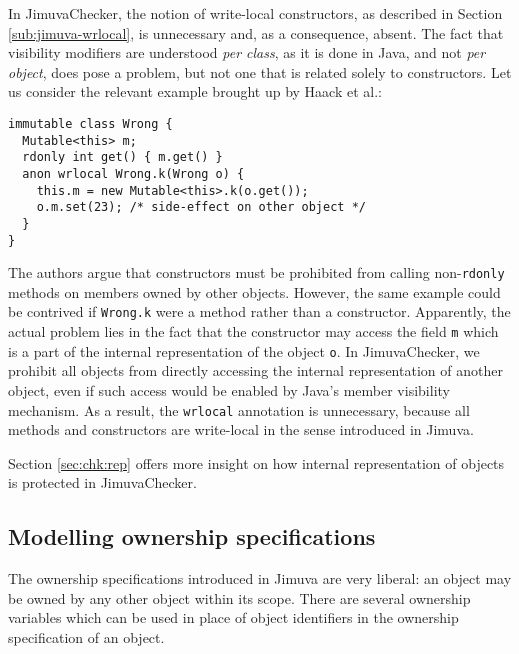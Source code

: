 \documentclass{pracamgr}
\theoremstyle{break}
\theoremstyle{break}
\theoremstyle{break}
\begin{document}
In JimuvaChecker, the notion of write-local constructors, as described
in Section \ref{sub:jimuva-wrlocal}, is unnecessary and, as a
consequence, absent. The fact that visibility modifiers are understood
\emph{per class}, as it is done in Java, and not \emph{per object},
does pose a problem, but not one that is related solely to
constructors. Let us consider the relevant example brought up by Haack
et al.:
\begin{lstlisting}[morekeywords={immutable, anon, wrlocal, rdonly}]
immutable class Wrong {
  Mutable<this> m; 
  rdonly int get() { m.get() }
  anon wrlocal Wrong.k(Wrong o) {
    this.m = new Mutable<this>.k(o.get()); 
    o.m.set(23); /* side-effect on other object */
  }
}
\end{lstlisting}
The authors argue that constructors must be prohibited from calling
non-\texttt{rdonly} methods on members owned by other
objects. However, the same example could be contrived if
\texttt{Wrong.k} were a method rather than a constructor. Apparently,
the actual problem lies in the fact that the constructor may access
the field \texttt{m} which is a part of the internal representation of
the object \texttt{o}. In JimuvaChecker, we prohibit all objects from
directly accessing the internal representation of another object, even
if such access would be enabled by Java's member visibility
mechanism. As a result, the \texttt{wrlocal} annotation is
unnecessary, because all methods and constructors are write-local in
the sense introduced in Jimuva.

Section \ref{sec:chk:rep} offers more insight on how internal
representation of objects is protected in JimuvaChecker. 


\subsection{Modelling ownership specifications}
\label{sec:mod:ownership}

The ownership specifications introduced in Jimuva are very liberal: an
object may be owned by any other object within its scope.  There are
several ownership variables which can be used in place of object
identifiers in the ownership specification of an object.
\end{document}
